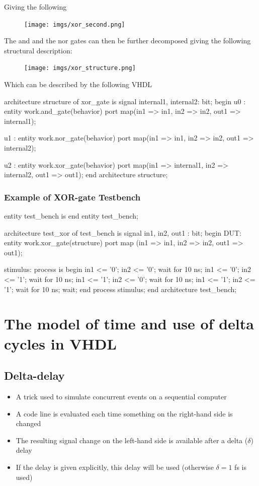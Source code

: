 \documentclass[a4paper,11pt,norsk]{article}
\begin{document}
Giving the following 
\begin{figure}[H]
    \centering
    \texttt{[image: imgs/xor\_second.png]}
\end{figure}

The and and the nor gates can then be further decomposed giving the following structural description:
\begin{figure}[H]
    \centering
    \texttt{[image: imgs/xor\_structure.png]}
\end{figure}
Which can be described by the following VHDL

\begin{vhdlcode}
architecture structure of xor_gate is
    signal internal1, internal2: bit;
begin
    u0 : entity work.and_gate(behavior) 
        port map(in1 => in1, in2 => in2, out1 => internal1);

    u1 : entity work.nor_gate(behavior) 
        port map(in1 => in1, in2 => in2, out1 => internal2);

    u2 : entity work.xor_gate(behavior) 
        port map(in1 => internal1, in2 => internal2, out1 => out1);
end architecture structure;
\end{vhdlcode}

\subsubsection{Example of XOR-gate Testbench}
\begin{vhdlcode}
entity test_bench is
end entity test_bench;

architecture test_xor of test_bench is 
    signal in1, in2, out1 : bit;
begin
    DUT: entity work.xor_gate(structure)
        port map (in1 => in1, in2 => in2, out1 => out1);

    stimulus: process is
    begin
        in1 <= '0'; in2 <= '0'; wait for 10 ns;
        in1 <= '0'; in2 <= '1'; wait for 10 ns;
        in1 <= '1'; in2 <= '0'; wait for 10 ns;
        in1 <= '1'; in2 <= '1'; wait for 10 ns;
        wait;
    end process stimulus;
end architecture test_bench;
\end{vhdlcode}

\section{The model of time and use of delta cycles in VHDL}
\subsection{Delta-delay}
\begin{itemize}
    \item A trick used to simulate concurrent events on a sequential computer 
    \item A code line is evaluated each time something on the right-hand side is changed
    \item The resulting signal change on the left-hand side is available after a delta ($\delta$) delay
    \item If the delay is given explicitly, this delay will be used (otherwise $\delta = 1$ fs is used)
\end{itemize}
\end{document}
